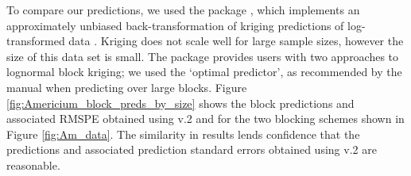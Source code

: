 \documentclass[nojss]{jss}
\begin{document}
To compare our predictions, we used the  package  \citep{georob}, which implements an approximately unbiased back-transformation of kriging predictions of log-transformed data \citep{Cressie_2006_block_kriging_lognormal_spatial_processes}. 
Kriging does not scale well for large sample sizes, however %
 the size of this data set is small. %
 The package  provides users with two approaches to lognormal block kriging; 
we used the `optimal predictor', as recommended by the  manual when predicting over large blocks.
Figure \ref{fig:Americium_block_preds_by_size} shows the block predictions and associated RMSPE obtained using  v.2 and  for the two blocking schemes shown in Figure \ref{fig:Am_data}.
The similarity in results lends confidence that the predictions and associated prediction standard errors obtained using  v.2 are reasonable.
\end{document}
